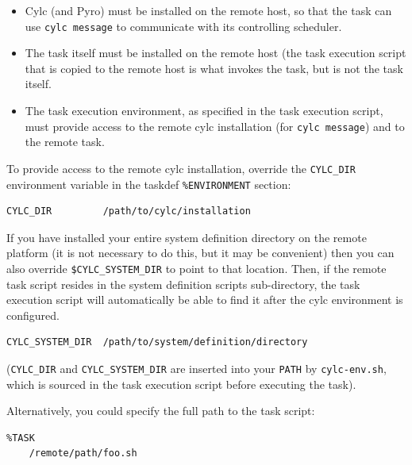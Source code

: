 \documentclass[11pt,a4paper]{article}
\begin{document}
\begin{itemize}

    \item Cylc (and Pyro) must be installed on the remote host, so that 
        the task can use \lstinline=cylc message= to communicate with
        its controlling scheduler.
        
    \item The task itself must be installed on the remote host (the task
        execution script that is copied to the remote host is what
        invokes the task, but is not the task itself. 

    \item The task execution environment, as specified in the task
        execution script, must provide access to the remote cylc
        installation (for \lstinline=cylc message=) and to the remote
        task.

\end{itemize}

\lstset{language=cylctaskdef}

To provide access to the remote cylc installation, override the 
\lstinline=CYLC_DIR= environment variable in the taskdef
\lstinline=%ENVIRONMENT= section:

\begin{lstlisting}
CYLC_DIR         /path/to/cylc/installation
\end{lstlisting}

If you have installed your entire system definition directory on the
remote platform (it is not necessary to do this, but it may be
convenient) then you can also override \lstinline=$CYLC_SYSTEM_DIR= to
point to that location. Then, if the remote task script resides in the
system definition scripts sub-directory, the task execution script will
automatically be able to find it after the cylc environment is
configured.

\begin{lstlisting}
CYLC_SYSTEM_DIR  /path/to/system/definition/directory
\end{lstlisting}

(\lstinline=CYLC_DIR=  and \lstinline=CYLC_SYSTEM_DIR= are inserted
into your \lstinline=PATH= by \lstinline=cylc-env.sh=, which is sourced
in the task execution script before executing the task).

Alternatively, you could specify the full path to the task script:

\begin{lstlisting}
%TASK
    /remote/path/foo.sh
\end{lstlisting}
\end{document}
